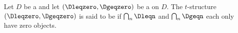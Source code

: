 \begin{definition} \label{definition:non_degenerate_t_structure_on_a_triangulated_category}
    Let $D$ be a  and let $(\Dleqzero, \Dgeqzero)$ be a  on $D$. 
    The $t$-structure $(\Dleqzero, \Dgeqzero)$ is said to be  if $\bigcap_n \Dleqn$ and $\bigcap_n \Dgeqn$ each only have zero objects. 
\end{definition}